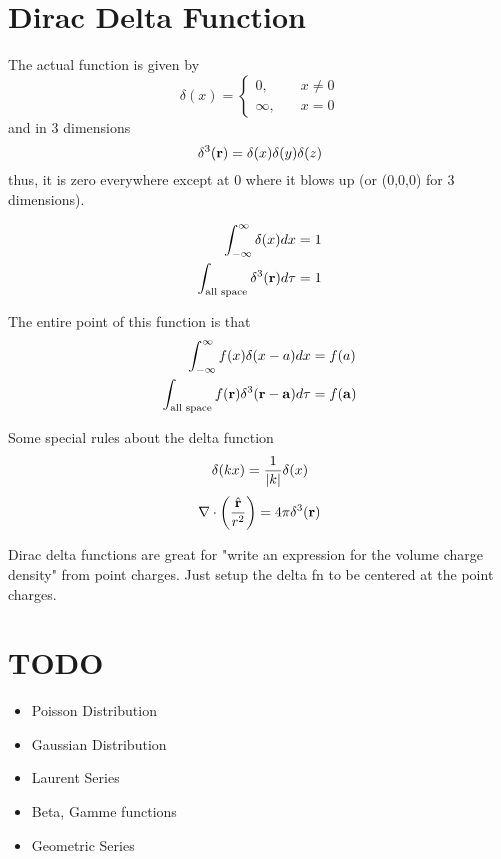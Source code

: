 \documentclass{article}
\newcommand{\vh}[1]{\hat{\vb{#1}}}
\begin{document}
\section{Dirac Delta Function}
The actual function is given by 
$$
\delta(x) = 
\begin{cases}
0, &\quad x \neq 0 \\
\infty, &\quad x = 0
\end{cases}
$$
and in 3 dimensions
$$
\delta^3(\vb{r}) = \delta(x) \delta(y) \delta(z)
$$
thus, it is zero everywhere except at 0 where it blows up (or (0,0,0) for 3 dimensions).

\begin{align*}
\int_{-\infty}^{\infty} \delta(x) dx & = 1 \\
\int_{\text{all space}} \delta^3{(\vb{r})} d\tau & = 1
\end{align*}

The entire point of this function is that
\begin{align*}
\int_{-\infty}^{\infty} f(x) \delta(x-a) dx & = f(a) \\ \int_{\text{all space}} f(\vb{r})\delta^3{(\vb{r-\vb{a}})} d\tau &  = f(\vb{a})
\end{align*}

Some special rules about the delta function
$$
\delta(kx) = \frac{1}{\abs{k}} \delta(x)
$$
$$
\nabla \cdot \left( \frac{\vh{r}}{r^2} \right) = 4\pi\delta^3(\vb{r})
$$

Dirac delta functions are great for "write an expression for the volume charge density" from point charges.  Just setup the delta fn to be centered at the point charges.



\section{TODO}
\begin{itemize}
	\item Poisson Distribution
	\item Gaussian Distribution
	\item Laurent Series
	\item Beta, Gamme functions
	\item Geometric Series
\end{itemize}
\end{document}

